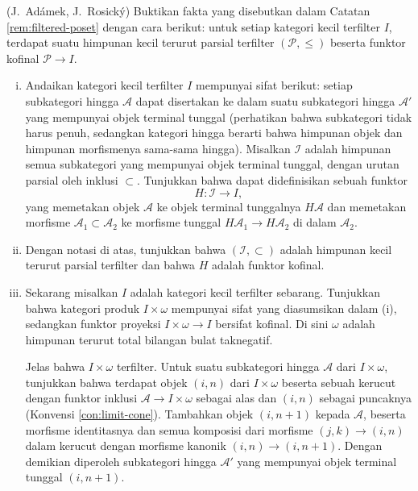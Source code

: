 \begin{Exercises}
	\item (J.\ Adámek, J.\ Rosický) Buktikan fakta yang disebutkan dalam Catatan \ref{rem:filtered-poset} dengan cara berikut: untuk setiap kategori kecil terfilter $I$, terdapat suatu himpunan kecil terurut parsial terfilter $(\mathcal{P}, \leq)$ beserta funktor kofinal $\mathcal{P} \to I$.
	\begin{enumerate}[(i)]
		\item Andaikan kategori kecil terfilter $I$ mempunyai sifat berikut: setiap subkategori hingga $\mathcal{A}$ dapat disertakan ke dalam suatu subkategori hingga $\mathcal{A}'$ yang mempunyai objek terminal tunggal (perhatikan bahwa subkategori tidak harus penuh, sedangkan kategori hingga berarti bahwa himpunan objek dan himpunan morfismenya sama-sama hingga). Misalkan $\mathcal{I}$ adalah himpunan semua subkategori yang mempunyai objek terminal tunggal, dengan urutan parsial oleh inklusi $\subset$. Tunjukkan bahwa dapat didefinisikan sebuah funktor
		\[ H: \mathcal{I} \to I, \]
		yang memetakan objek $\mathcal{A}$ ke objek terminal tunggalnya $H\mathcal{A}$ dan memetakan morfisme $\mathcal{A}_1 \subset \mathcal{A}_2$ ke morfisme tunggal $H\mathcal{A}_1 \to H\mathcal{A}_2$ di dalam $\mathcal{A}_2$.
		\item Dengan notasi di atas, tunjukkan bahwa $(\mathcal{I}, \subset)$ adalah himpunan kecil terurut parsial terfilter dan bahwa $H$ adalah funktor kofinal.
		\item Sekarang misalkan $I$ adalah kategori kecil terfilter sebarang. Tunjukkan bahwa kategori produk $I \times \omega$ mempunyai sifat yang diasumsikan dalam (i), sedangkan funktor proyeksi $I \times \omega \to I$ bersifat kofinal. Di sini $\omega$ adalah himpunan terurut total bilangan bulat taknegatif.
		
		\begin{hint}
			Jelas bahwa $I \times \omega$ terfilter. Untuk suatu subkategori hingga $\mathcal{A}$ dari $I \times \omega$, tunjukkan bahwa terdapat objek $(i, n)$ dari $I \times \omega$ beserta sebuah kerucut dengan funktor inklusi $\mathcal{A} \to I \times \omega$ sebagai alas dan $(i, n)$ sebagai puncaknya (Konvensi \ref{con:limit-cone}). Tambahkan objek $(i, n+1)$ kepada $\mathcal{A}$, beserta morfisme identitasnya dan semua komposisi dari morfisme $(j, k) \to (i, n)$ dalam kerucut dengan morfisme kanonik $(i, n) \to (i, n+1)$. Dengan demikian diperoleh subkategori hingga $\mathcal{A}'$ yang mempunyai objek terminal tunggal $(i, n+1)$.
		\end{hint}
	

\end{enumerate}
\end{Exercises}
